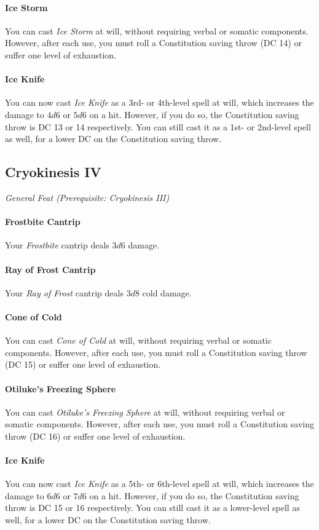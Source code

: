 \documentclass[twocolumn]{dndbook}
\begin{document}
\paragraph*{Ice Storm} You can cast \emph{Ice Storm} at will,
without requiring verbal or somatic components. However, after each use, you must roll a Constitution saving throw (DC 14) or suffer one level of exhaustion.
\paragraph*{Ice Knife} You can now cast \emph{Ice Knife} as a 3rd- or 4th-level spell at will,
which increases the damage to $ 4d6 $ or $ 5d6 $ on a hit. However, if you do so, the Constitution saving throw is DC 13 or 14 respectively.
You can still cast it as a 1st- or 2nd-level spell as well, for a lower DC on the Constitution saving throw.

\subsection{Cryokinesis IV}
{\emph{General Feat (Prerequisite: Cryokinesis III)}}\par
\paragraph*{Frostbite Cantrip} Your \emph{Frostbite} cantrip deals $ 3d6 $ damage.
\paragraph*{Ray of Frost Cantrip} Your \emph{Ray of Frost} cantrip deals $ 3d8 $ cold damage.
\paragraph*{Cone of Cold} You can cast \emph{Cone of Cold} at will,
without requiring verbal or somatic components. However, after each use, you must roll a Constitution saving throw (DC 15) or suffer one level of exhaustion.
\paragraph*{Otiluke's Freezing Sphere} You can cast \emph{Otiluke's Freezing Sphere} at will,
without requiring verbal or somatic components. However, after each use, you must roll a Constitution saving throw (DC 16) or suffer one level of exhaustion.
\paragraph*{Ice Knife} You can now cast \emph{Ice Knife} as a 5th- or 6th-level spell at will,
which increases the damage to $ 6d6 $ or $ 7d6 $ on a hit. However, if you do so, the Constitution saving throw is DC 15 or 16 respectively.
You can still cast it as a lower-level spell as well, for a lower DC on the Constitution saving throw.
\end{document}
